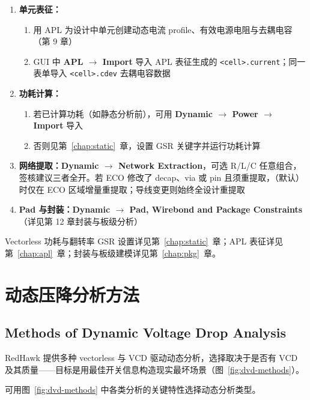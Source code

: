 \begin{enumerate}
  \item \textbf{单元表征：}
  \begin{enumerate}
    \item 用 APL 为设计中单元创建动态电流 profile、有效电源电阻与去耦电容（第 9 章）
    \item GUI 中 \textbf{APL $\rightarrow$ Import} 导入 APL 表征生成的 \texttt{<cell>.current}；同一表单导入 \texttt{<cell>.cdev} 去耦电容数据
  \end{enumerate}
  \item \textbf{功耗计算：}
  \begin{enumerate}
    \item 若已计算功耗（如静态分析前），可用 \textbf{Dynamic $\rightarrow$ Power $\rightarrow$ Import} 导入
    \item 否则见第~\ref{chap:static}~章，设置 GSR 关键字并运行功耗计算
  \end{enumerate}
  \item \textbf{网络提取：}\textbf{Dynamic $\rightarrow$ Network Extraction}，可选 R/L/C 任意组合，签核建议三者全开。若 ECO 修改了 decap、via 或 pin 且须重提取，（默认）时仅在 ECO 区域增量重提取；导线变更则始终全设计重提取
  \item \textbf{Pad 与封装：}\textbf{Dynamic $\rightarrow$ Pad, Wirebond and Package Constraints}（详见第 12 章封装与板级分析）
\end{enumerate}

\begin{seeAlsoBox}
Vectorless 功耗与翻转率 GSR 设置详见第~\ref{chap:static}~章；APL 表征详见第~\ref{chap:apl}~章；封装与板级建模详见第~\ref{chap:pkg}~章。
\end{seeAlsoBox}

\section{动态压降分析方法}
\subsection*{Methods of Dynamic Voltage Drop Analysis}

RedHawk 提供多种 vectorless 与 VCD 驱动动态分析，选择取决于是否有 VCD 及其质量——目标是用最佳开关信息构造现实最坏场景（图~\ref{fig:dvd-methods}）。

\label{fig:dvd-methods}

可用图~\ref{fig:dvd-methods} 中各类分析的关键特性选择动态分析类型。

